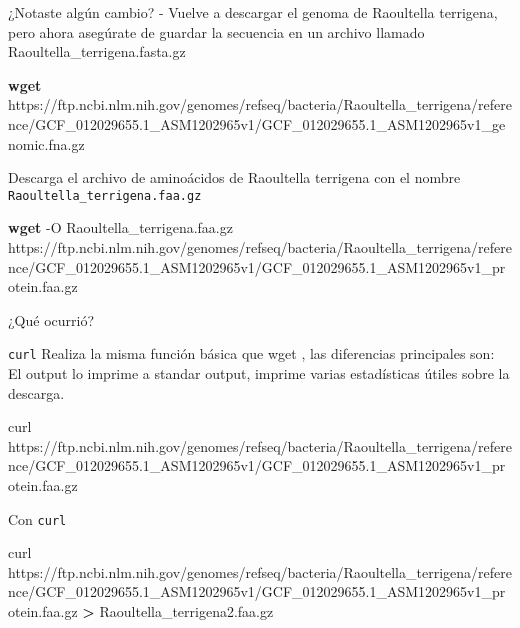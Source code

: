 \documentclass[
]{book}
\newenvironment{Shaded}{\begin{snugshade}}{\end{snugshade}}
\newcommand{\AttributeTok}[1]{\textcolor[rgb]{0.13,0.29,0.53}{#1}}
\newcommand{\ExtensionTok}[1]{#1}
\newcommand{\FunctionTok}[1]{\textcolor[rgb]{0.13,0.29,0.53}{\textbf{#1}}}
\newcommand{\NormalTok}[1]{#1}
\newcommand{\OperatorTok}[1]{\textcolor[rgb]{0.81,0.36,0.00}{\textbf{#1}}}
\begin{document}
¿Notaste algún cambio?
- Vuelve a descargar el genoma de Raoultella terrigena, pero ahora asegúrate de guardar la secuencia en un archivo llamado Raoultella\_terrigena.fasta.gz

\begin{Shaded}
\begin{Highlighting}[]
\FunctionTok{wget}\NormalTok{ https://ftp.ncbi.nlm.nih.gov/genomes/refseq/bacteria/Raoultella\_terrigena/reference/GCF\_012029655.1\_ASM1202965v1/GCF\_012029655.1\_ASM1202965v1\_genomic.fna.gz}
\end{Highlighting}
\end{Shaded}

Descarga el archivo de aminoácidos de Raoultella terrigena con el nombre \texttt{Raoultella\_terrigena.faa.gz}

\begin{Shaded}
\begin{Highlighting}[]
\FunctionTok{wget} \AttributeTok{{-}O}\NormalTok{ Raoultella\_terrigena.faa.gz https://ftp.ncbi.nlm.nih.gov/genomes/refseq/bacteria/Raoultella\_terrigena/reference/GCF\_012029655.1\_ASM1202965v1/GCF\_012029655.1\_ASM1202965v1\_protein.faa.gz}
\end{Highlighting}
\end{Shaded}

¿Qué ocurrió?

\texttt{curl} Realiza la misma función básica que wget , las diferencias principales son: El output lo imprime a standar output, imprime varias estadísticas útiles sobre la descarga.

\begin{Shaded}
\begin{Highlighting}[]
\ExtensionTok{curl}\NormalTok{ https://ftp.ncbi.nlm.nih.gov/genomes/refseq/bacteria/Raoultella\_terrigena/reference/GCF\_012029655.1\_ASM1202965v1/GCF\_012029655.1\_ASM1202965v1\_protein.faa.gz}
\end{Highlighting}
\end{Shaded}

Con \texttt{curl}

\begin{Shaded}
\begin{Highlighting}[]
\ExtensionTok{curl}
\ExtensionTok{https://ftp.ncbi.nlm.nih.gov/genomes/refseq/bacteria/Raoultella\_terrigena/reference/GCF\_012029655.1\_ASM1202965v1/GCF\_012029655.1\_ASM1202965v1\_protein.faa.gz} \OperatorTok{\textgreater{}}\NormalTok{ Raoultella\_terrigena2.faa.gz}
\end{Highlighting}
\end{Shaded}
\end{document}

